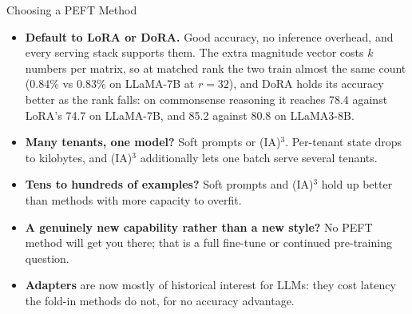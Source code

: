 \begin{frame}[t]{Choosing a PEFT Method}
  \begin{itemize}\itemsep0.4em
    \item[\textcolor{red}{$\blacktriangleright$}] \textbf{Default to LoRA or DoRA.} Good accuracy, no inference overhead, and every serving stack supports them. The extra magnitude vector costs $k$ numbers per matrix, so at matched rank the two train almost the same count (0.84\% vs 0.83\% on LLaMA-7B at $r=32$), and DoRA holds its accuracy better as the rank falls: on commonsense reasoning it reaches 78.4 against LoRA's 74.7 on LLaMA-7B, and 85.2 against 80.8 on LLaMA3-8B.
    \item[\textcolor{red}{$\blacktriangleright$}] \textbf{Many tenants, one model?} Soft prompts or (IA)$^3$. Per-tenant state drops to kilobytes, and (IA)$^3$ additionally lets one batch serve several tenants.
    \item[\textcolor{red}{$\blacktriangleright$}] \textbf{Tens to hundreds of examples?} Soft prompts and (IA)$^3$ hold up better than methods with more capacity to overfit.
    \item[\textcolor{red}{$\blacktriangleright$}] \textbf{A genuinely new capability rather than a new style?} No PEFT method will get you there; that is a full fine-tune or continued pre-training question.
    \item[\textcolor{red}{$\blacktriangleright$}] \textbf{Adapters} are now mostly of historical interest for LLMs: they cost latency the fold-in methods do not, for no accuracy advantage.
  \end{itemize}
\end{frame}

